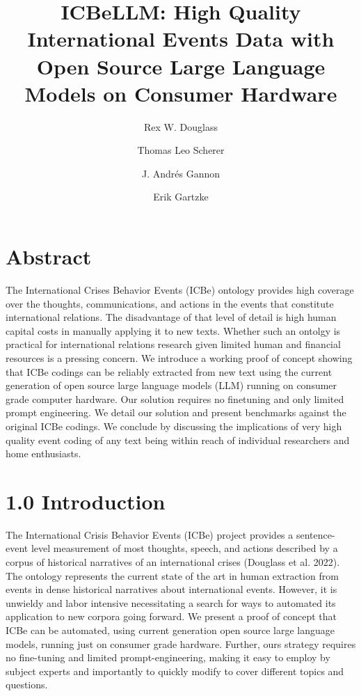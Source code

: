 \documentclass[
  letterpaper,
  DIV=11,
  numbers=noendperiod]{scrartcl}
\title{ICBeLLM: High Quality International Events Data with Open Source
Large Language Models on Consumer Hardware}
\author{Rex W. Douglass \and Thomas Leo Scherer \and J. Andrés
Gannon \and Erik Gartzke}
\date{}
\begin{document}
\maketitle
\hypertarget{abstract}{%
\section{Abstract}\label{abstract}}

The International Crises Behavior Events (ICBe) ontology provides high
coverage over the thoughts, communications, and actions in the events
that constitute international relations. The disadvantage of that level
of detail is high human capital costs in manually applying it to new
texts. Whether such an ontolgy is practical for international relations
research given limited human and financial resources is a pressing
concern. We introduce a working proof of concept showing that ICBe
codings can be reliably extracted from new text using the current
generation of open source large language models (LLM) running on
consumer grade computer hardware. Our solution requires no finetuning
and only limited prompt engineering. We detail our solution and present
benchmarks against the original ICBe codings. We conclude by discussing
the implications of very high quality event coding of any text being
within reach of individual researchers and home enthusiasts.

\hypertarget{introduction}{%
\section{1.0 Introduction}\label{introduction}}

The International Crisis Behavior Events (ICBe) project provides a
sentence-event level measurement of most thoughts, speech, and actions
described by a corpus of historical narratives of an international
crises (Douglass et al. 2022). The ontology represents the current state
of the art in human extraction from events in dense historical
narratives about international events. However, it is unwieldy and labor
intensive necessitating a search for ways to automated its application
to new corpora going forward. We present a proof of concept that ICBe
can be automated, using current generation open source large language
models, running just on consumer grade hardware. Further, ours strategy
requires no fine-tuning and limited prompt-engineering, making it easy
to employ by subject experts and importantly to quickly modify to cover
different topics and questions.
\end{document}
